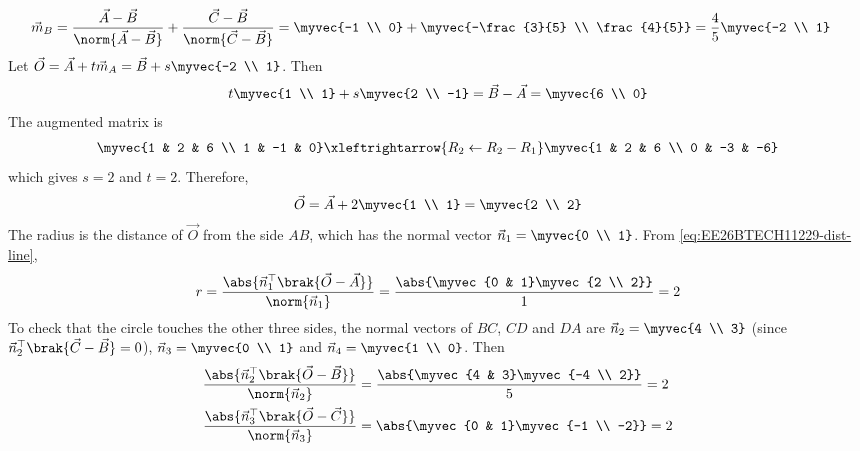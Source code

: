 \begin{enumerate}[label=\thesubsection.\arabic*, ref=\thesubsection.\theenumi]
\begin{align}
	\\
	\vec{m}_B &= \frac{\vec{A}-\vec{B}}{\norm{\vec{A}-\vec{B}}} + \frac{\vec{C}-\vec{B}}{\norm{\vec{C}-\vec{B}}} = \myvec{-1 \\ 0} + \myvec{-\frac{3}{5} \\ \frac{4}{5}} = \frac{4}{5}\myvec{-2 \\ 1}
\end{align}
Let $\vec{O} = \vec{A} + t\vec{m}_A = \vec{B} + s\myvec{-2 \\ 1}$. Then
\begin{align}
	t\myvec{1 \\ 1} + s\myvec{2 \\ -1} = \vec{B} - \vec{A} = \myvec{6 \\ 0}
\end{align}
The augmented matrix is
\begin{align}
	\myvec{1 & 2 & 6 \\ 1 & -1 & 0} \xleftrightarrow{R_2 \leftarrow R_2 - R_1} \myvec{1 & 2 & 6 \\ 0 & -3 & -6}
\end{align}
which gives $s = 2$ and $t = 2$. Therefore,
\begin{align}
	\vec{O} = \vec{A} + 2\myvec{1 \\ 1} = \myvec{2 \\ 2}
\end{align}
The radius is the distance of $\vec{O}$ from the side $AB$, which has the normal vector $\vec{n}_1 = \myvec{0 \\ 1}$. From \eqref{eq:EE26BTECH11229-dist-line},
\begin{align}
	r = \frac{\abs{\vec{n}_1^{\top}\brak{\vec{O}-\vec{A}}}}{\norm{\vec{n}_1}} = \frac{\abs{\myvec{0 & 1}\myvec{2 \\ 2}}}{1} = 2
\end{align}
To check that the circle touches the other three sides, the normal vectors of $BC$, $CD$ and $DA$ are $\vec{n}_2 = \myvec{4 \\ 3}$ (since $\vec{n}_2^{\top}\brak{\vec{C}-\vec{B}} = 0$), $\vec{n}_3 = \myvec{0 \\ 1}$ and $\vec{n}_4 = \myvec{1 \\ 0}$. Then
\begin{align}
	\frac{\abs{\vec{n}_2^{\top}\brak{\vec{O}-\vec{B}}}}{\norm{\vec{n}_2}} &= \frac{\abs{\myvec{4 & 3}\myvec{-4 \\ 2}}}{5} = 2
	\\
	\frac{\abs{\vec{n}_3^{\top}\brak{\vec{O}-\vec{C}}}}{\norm{\vec{n}_3}} &= \abs{\myvec{0 & 1}\myvec{-1 \\ -2}} = 2

\end{align}
\end{enumerate}
